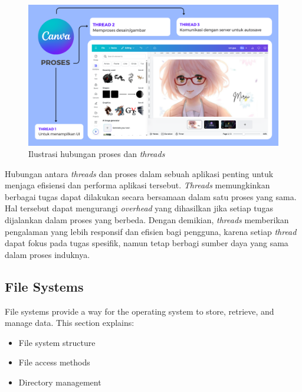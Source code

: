 \documentclass[12pt]{article}
\begin{document}
\begin{enumerate}
    \begin{figure}[h]
        \centering
        \includegraphics[width=1\linewidth]{asset/proces-and-threads-illustration.png}
        \caption{Ilustrasi hubungan proses dan \textit{threads}}
        \label{fig:ilustrasi-proses-dan-threads}
    \end{figure}
    
\end{enumerate}

\hspace{1cm}

Hubungan antara \textit{threads} dan proses dalam sebuah aplikasi penting untuk menjaga efisiensi dan performa aplikasi tersebut. \textit{Threads} memungkinkan berbagai tugas dapat dilakukan secara bersamaan dalam satu proses yang sama. Hal tersebut dapat mengurangi \textit{overhead} yang dihasilkan jika setiap tugas dijalankan dalam proses yang berbeda. Dengan demikian, \textit{threads} memberikan pengalaman yang lebih responsif dan efisien bagi pengguna, karena setiap \textit{thread} dapat fokus pada tugas spesifik, namun tetap berbagi sumber daya yang sama dalam proses induknya.


\subsection{File Systems}
File systems provide a way for the operating system to store, retrieve, and manage data. This section explains:
\begin{itemize}
    \item File system structure
    \item File access methods
    \item Directory management
\end{itemize}
\end{document}
